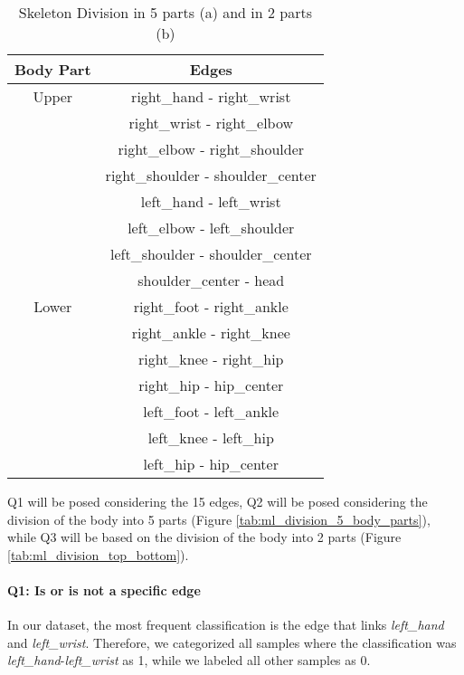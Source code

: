 \begin{table}[H]
    \begin{subtable}{\textwidth}
        \centering
        \begin{tabular}{||c||c||}
            \hline
            \textbf{Body Part} & \textbf{Edges} \\
            \hline
            Upper & right\_hand - right\_wrist \\
            & right\_wrist - right\_elbow \\
            & right\_elbow - right\_shoulder \\
            & right\_shoulder - shoulder\_center \\
            & left\_hand - left\_wrist \\
            & left\_elbow - left\_shoulder \\
            & left\_shoulder - shoulder\_center \\
            & shoulder\_center - head \\
            \hline
            Lower & right\_foot - right\_ankle \\
            & right\_ankle - right\_knee \\
            & right\_knee - right\_hip \\
            & right\_hip - hip\_center \\
            & left\_foot - left\_ankle \\
            & left\_knee - left\_hip \\
            & left\_hip - hip\_center \\
            \hline
        \end{tabular}
        \caption{}
        \label{tab:ml_division_top_bottom}
    \end{subtable}

    \caption{Skeleton Division in 5 parts (a) and in 2 parts (b)}
    \label{tab:ml_skeleton_divisions}
\end{table}

Q1 will be posed considering the 15 edges, Q2 will be posed considering the division of the body into 5 parts (Figure \ref{tab:ml_division_5_body_parts}), while Q3 will be based on the division of the body into 2 parts (Figure \ref{tab:ml_division_top_bottom}).

\paragraph{Q1: Is or is not a specific edge} In our dataset, the most frequent classification is the edge that links \textit{left\_hand} and \textit{left\_wrist}. 
Therefore, we categorized all samples where the classification was \textit{left\_hand}-\textit{left\_wrist} as 1, while we labeled all other samples as 0.   
    
